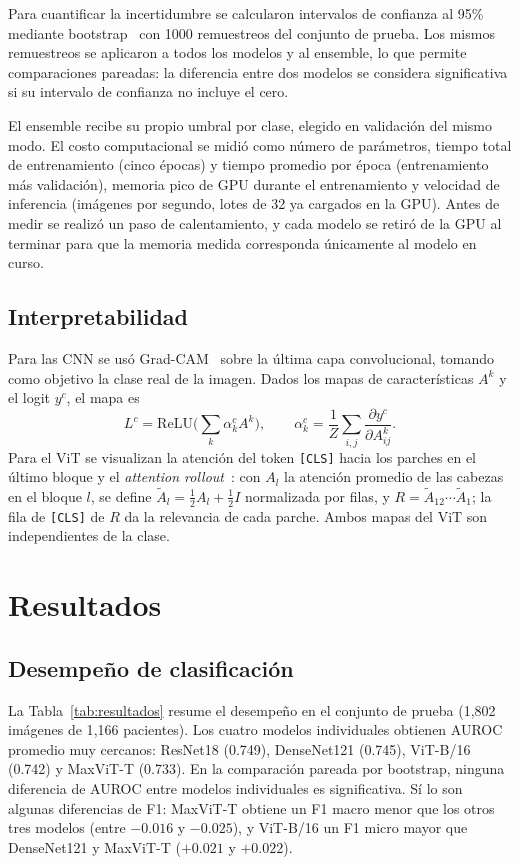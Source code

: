 \documentclass[conference]{IEEEtran}
\begin{document}
Para cuantificar la incertidumbre se calcularon intervalos de confianza al 95\% mediante bootstrap~\cite{efron1993bootstrap} con 1000 remuestreos del conjunto de prueba. Los mismos remuestreos se aplicaron a todos los modelos y al ensemble, lo que permite comparaciones pareadas: la diferencia entre dos modelos se considera significativa si su intervalo de confianza no incluye el cero.

El ensemble recibe su propio umbral por clase, elegido en validación del mismo modo. El costo computacional se midió como número de parámetros, tiempo total de entrenamiento (cinco épocas) y tiempo promedio por época (entrenamiento más validación), memoria pico de GPU durante el entrenamiento y velocidad de inferencia (imágenes por segundo, lotes de 32 ya cargados en la GPU). Antes de medir se realizó un paso de calentamiento, y cada modelo se retiró de la GPU al terminar para que la memoria medida corresponda únicamente al modelo en curso.

\subsection{Interpretabilidad}
Para las CNN se usó Grad-CAM~\cite{selvaraju2017gradcam} sobre la última capa convolucional, tomando como objetivo la clase real de la imagen. Dados los mapas de características $A^k$ y el logit $y^c$, el mapa es
\begin{equation}
L^c = \mathrm{ReLU}\Big(\sum_k \alpha_k^c A^k\Big), \qquad \alpha_k^c = \frac{1}{Z}\sum_{i,j}\frac{\partial y^c}{\partial A^k_{ij}}.
\end{equation}
Para el ViT se visualizan la atención del token \texttt{[CLS]} hacia los parches en el último bloque y el \emph{attention rollout}~\cite{abnar2020rollout}: con $A_l$ la atención promedio de las cabezas en el bloque $l$, se define $\tilde{A}_l = \tfrac{1}{2}A_l + \tfrac{1}{2}I$ normalizada por filas, y $R = \tilde{A}_{12}\cdots\tilde{A}_{1}$; la fila de \texttt{[CLS]} de $R$ da la relevancia de cada parche. Ambos mapas del ViT son independientes de la clase.

\section{Resultados}

\subsection{Desempeño de clasificación}
La Tabla~\ref{tab:resultados} resume el desempeño en el conjunto de prueba (1{,}802 imágenes de 1{,}166 pacientes). Los cuatro modelos individuales obtienen AUROC promedio muy cercanos: ResNet18 (0.749), DenseNet121 (0.745), ViT-B/16 (0.742) y MaxViT-T (0.733). En la comparación pareada por bootstrap, ninguna diferencia de AUROC entre modelos individuales es significativa. Sí lo son algunas diferencias de F1: MaxViT-T obtiene un F1 macro menor que los otros tres modelos (entre $-0.016$ y $-0.025$), y ViT-B/16 un F1 micro mayor que DenseNet121 y MaxViT-T ($+0.021$ y $+0.022$).
\end{document}
